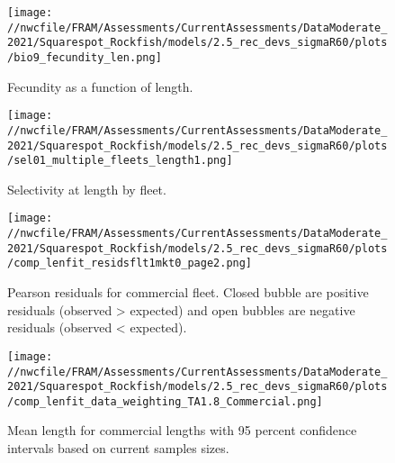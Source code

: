 \documentclass[11pt,
  english,
  a4paper,
]{article}
\begin{document}
\tagmcend\tagstructend


\begin{figure}
\centering
\texttt{[image: //nwcfile/FRAM/Assessments/CurrentAssessments/DataModerate\_2021/Squarespot\_Rockfish/models/2.5\_rec\_devs\_sigmaR60/plots/bio9\_fecundity\_len.png]}
\caption{Fecundity as a function of length.\label{fig:fecundity}}
\end{figure}

\tagmcend\tagstructend


\begin{figure}
\centering
\texttt{[image: //nwcfile/FRAM/Assessments/CurrentAssessments/DataModerate\_2021/Squarespot\_Rockfish/models/2.5\_rec\_devs\_sigmaR60/plots/sel01\_multiple\_fleets\_length1.png]}
\caption{Selectivity at length by fleet.\label{fig:selex}}
\end{figure}

\tagmcend\tagstructend


\begin{figure}
\centering
\texttt{[image: //nwcfile/FRAM/Assessments/CurrentAssessments/DataModerate\_2021/Squarespot\_Rockfish/models/2.5\_rec\_devs\_sigmaR60/plots/comp\_lenfit\_residsflt1mkt0\_page2.png]}
\caption{Pearson residuals for commercial fleet. Closed bubble are positive residuals (observed \textgreater{} expected) and open bubbles are negative residuals (observed \textless{} expected).\label{fig:com-pearson}}
\end{figure}

\tagmcend\tagstructend


\begin{figure}
\centering
\texttt{[image: //nwcfile/FRAM/Assessments/CurrentAssessments/DataModerate\_2021/Squarespot\_Rockfish/models/2.5\_rec\_devs\_sigmaR60/plots/comp\_lenfit\_data\_weighting\_TA1.8\_Commercial.png]}
\caption{Mean length for commercial lengths with 95 percent confidence intervals based on current samples sizes.\label{fig:com-mean-len-fit}}
\end{figure}
\end{document}
